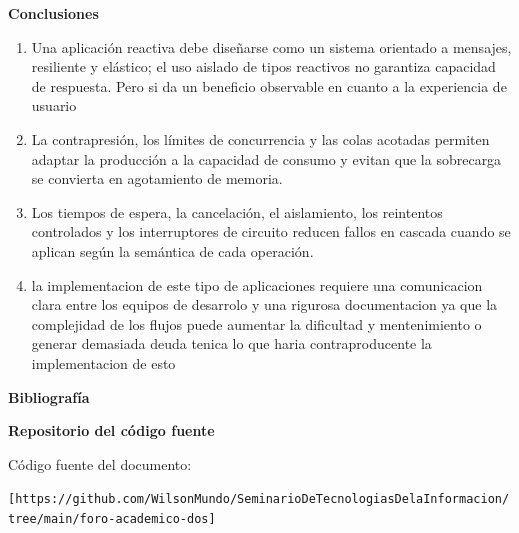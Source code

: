 \documentclass[12pt,letterpaper]{article}
\newcommand{\seccion}[1]{%
  \vspace{4pt}%
  {\noindent\textbf{#1}\par}%
  \vspace{1pt}%
}
\begin{document}
\seccion{Conclusiones}
\begin{enumerate}
  \item Una aplicación reactiva debe diseñarse como un sistema orientado a mensajes, resiliente y elástico; el uso aislado de tipos reactivos no garantiza capacidad de respuesta. Pero si da un beneficio observable en cuanto a la experiencia de usuario 
  \item La contrapresión, los límites de concurrencia y las colas acotadas permiten adaptar la producción a la capacidad de consumo y evitan que la sobrecarga se convierta en agotamiento de memoria.
  \item Los tiempos de espera, la cancelación, el aislamiento, los reintentos controlados y los interruptores de circuito reducen fallos en cascada cuando se aplican según la semántica de cada operación. 
  \item la implementacion de este tipo de aplicaciones requiere una comunicacion clara entre los equipos de desarrolo y una rigurosa documentacion ya que la complejidad de los flujos puede aumentar la dificultad y mentenimiento o generar demasiada deuda tenica lo que haria contraproducente la implementacion de esto
\end{enumerate}

\seccion{Bibliografía}
\printbibliography[heading=none]

\seccion{Repositorio del código fuente}
Código fuente del documento:\par
\texttt{[https://github.com/WilsonMundo/SeminarioDeTecnologiasDelaInformacion/tree/main/foro-academico-dos]}
\end{document}
